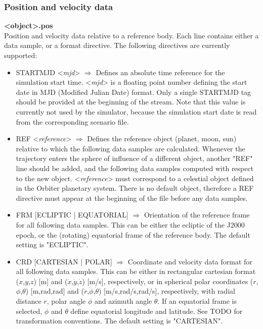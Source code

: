 \documentclass[Orbiter Technical Reference.tex]{subfiles}
\begin{document}
\subsubsection{Position and velocity data}
\textbf{<object>.pos}\\
Position and velocity data relative to a reference body. Each line contains either a data sample, or a format directive. The following directives are currently supported:

\begin{itemize}
\item STARTMJD <\textit{mjd}> $\Rightarrow$ Defines an absolute time reference for the simulation start time. <\textit{mjd}> is a floating point number defining the start date in MJD (Modified Julian Date) format. Only a single STARTMJD tag should be provided at the beginning of the stream. Note that this value is currently not used by the simulator, because the simulation start date is read from the corresponding scenario file.
\item REF <\textit{reference}> $\Rightarrow$ Defines the reference object (planet, moon, sun) relative to which the following data samples are calculated. Whenever the trajectory enters the sphere of influence of a different object, another "REF" line should be added, and the following data samples computed with respect to the new object. <\textit{reference}> must correspond to a celestial object defined in the Orbiter planetary system. There is no default object, therefore a REF directive must appear at the beginning of the file before any data samples.
\item FRM [ECLIPTIC | EQUATORIAL] $\Rightarrow$ Orientation of the reference frame for all following data samples. This can be either the ecliptic of the J2000 epoch, or the (rotating) equatorial frame of the reference body. The default setting is "ECLIPTIC".
\item CRD [CARTESIAN | POLAR] $\Rightarrow$ Coordinate and velocity data format for all following data samples. This can be either in rectangular cartesian format ($x$,$y$,$z$) [m] and ($\dot{x}$,$\dot{y}$,$\dot{z}$) [m/s], respectively, or in spherical polar coordinates ($r$,$\phi$,$\theta$) [m,rad,rad] and ($\dot{r}$,$\dot{\phi}$,$\dot{\theta}$) [m/s,rad/s,rad/s], respectively, with radial distance $r$, polar angle $\phi$ and azimuth angle $\theta$. If an equatorial frame is selected, $\phi$ and $\theta$ define equatorial longitude and latitude. See TODO for transformation conventions. The default setting is "CARTESIAN".
\end{itemize}
\end{document}
